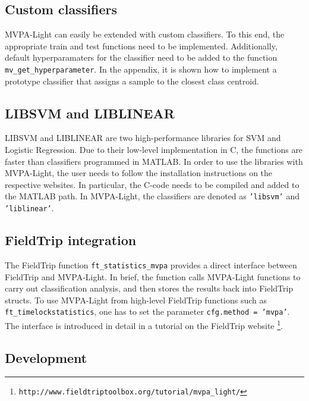 \documentclass[utf8]{frontiersSCNS} %
\newcommand{\ttt}[1]{\texttt{#1}}
\begin{document}
\subsection{Custom classifiers}

MVPA-Light can easily be extended with custom classifiers. To this end, the appropriate train and test functions need to be implemented. Additionally, default hyperparamaters for the classifier need to be added to the function \ttt{mv\_get\_hyperparameter}. In the appendix, it is shown how to implement a prototype classifier that assigns a sample to the closest class centroid.

\subsection{LIBSVM and LIBLINEAR}

LIBSVM \cite{Chang2011LIBSVM:Machines} and LIBLINEAR \cite{Fan2008} are two high-performance libraries for SVM and Logistic Regression. Due to their low-level implementation in C, the functions are faster than classifiers programmed in MATLAB. In order to use the libraries with MVPA-Light, the user needs to follow the installation instructions on the respective websites. In particular, the C-code needs to be compiled and added to the MATLAB path. In MVPA-Light, the classifiers are denoted as \ttt{'libsvm'} and \ttt{'liblinear'}.

\subsection{FieldTrip integration}

The FieldTrip \citep{Oostenveld2011} function \ttt{ft\_statistics\_mvpa} provides a direct interface between FieldTrip and MVPA-Light. In brief, the function calls MVPA-Light functions to carry out classification analysis, and then stores the results back into FieldTrip structs. To use MVPA-Light from high-level FieldTrip functions such as \ttt{ft\_timelockstatistics}, one has to set the parameter \ttt{cfg.method = 'mvpa'}. The interface is introduced in detail in a tutorial on the FieldTrip website \footnote{\ttt{http://www.fieldtriptoolbox.org/tutorial/mvpa\_light/}}.

\subsection{Development}\label{sec:development}
\end{document}
